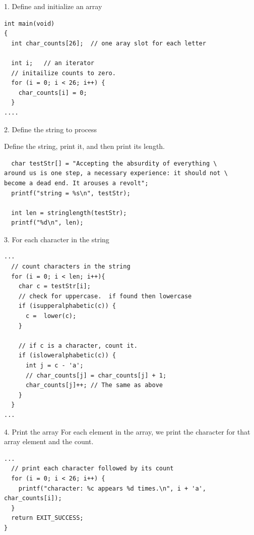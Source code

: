 \documentclass[10pt]{beamer}
\begin{document}
\begin{frame}[fragile]{1. Define and initialize an array}

\begin{verbatim}
int main(void)
{
  int char_counts[26];  // one aray slot for each letter
  
  int i;   // an iterator
  // initailize counts to zero.
  for (i = 0; i < 26; i++) {
    char_counts[i] = 0;
  }
....
\end{verbatim}

\end{frame}
\begin{frame}[fragile]{2. Define the string to process}

Define the string, print it, and then print its length.

\begin{verbatim}
  char testStr[] = "Accepting the absurdity of everything \
around us is one step, a necessary experience: it should not \
become a dead end. It arouses a revolt";
  printf("string = %s\n", testStr);

  int len = stringlength(testStr);
  printf("%d\n", len);
\end{verbatim}

\end{frame}
\begin{frame}[fragile]{3. For each character in the string}

\begin{verbatim}
...
  // count characters in the string
  for (i = 0; i < len; i++){
    char c = testStr[i];
    // check for uppercase.  if found then lowercase
    if (isupperalphabetic(c)) {
      c =  lower(c);
    }

    // if c is a character, count it.
    if (isloweralphabetic(c)) {
      int j = c - 'a';
      // char_counts[j] = char_counts[j] + 1;
      char_counts[j]++; // The same as above
    }
  }
...
\end{verbatim}
\end{frame}
\begin{frame}[fragile]{4. Print the array}
For each element in the array, we print the character for that array element and the count.
\begin{verbatim}
...
  // print each character followed by its count
  for (i = 0; i < 26; i++) {
    printf("character: %c appears %d times.\n", i + 'a', char_counts[i]);
  }
  return EXIT_SUCCESS;
}
\end{verbatim}

\end{frame}
\end{document}
